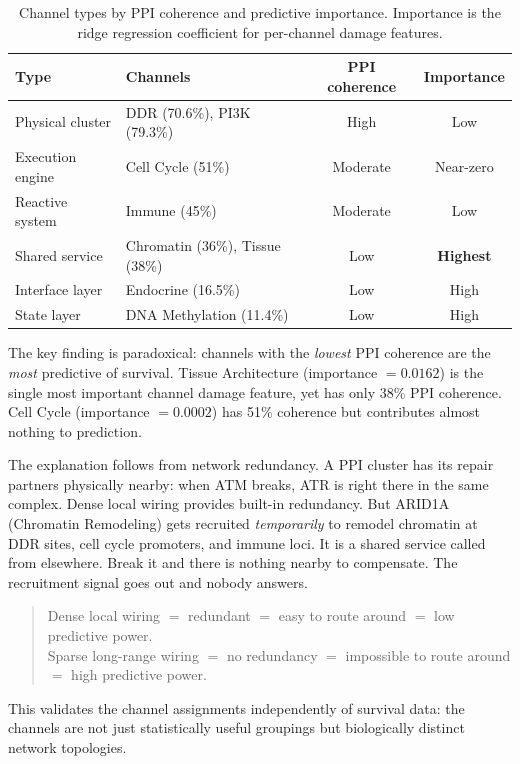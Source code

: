 \documentclass[11pt]{article}
\begin{document}
\begin{table}[ht]
\centering
\caption{Channel types by PPI coherence and predictive
importance. Importance is the ridge regression coefficient for
per-channel damage features.}
\label{tab:ppi}
\begin{tabular}{@{}llcc@{}}
\toprule
Type & Channels & PPI coherence & Importance \\
\midrule
Physical cluster & DDR (70.6\%), PI3K (79.3\%) & High & Low \\
Execution engine & Cell Cycle (51\%) & Moderate & Near-zero \\
Reactive system & Immune (45\%) & Moderate & Low \\
Shared service & Chromatin (36\%), Tissue (38\%) & Low & \textbf{Highest} \\
Interface layer & Endocrine (16.5\%) & Low & High \\
State layer & DNA Methylation (11.4\%) & Low & High \\
\bottomrule
\end{tabular}
\end{table}

The key finding is paradoxical: channels with the \emph{lowest}
PPI coherence are the \emph{most} predictive of survival.
Tissue Architecture (importance $= 0.0162$) is the single most
important channel damage feature, yet has only 38\% PPI
coherence. Cell Cycle (importance $= 0.0002$) has 51\% coherence
but contributes almost nothing to prediction.

The explanation follows from network redundancy. A PPI cluster
has its repair partners physically nearby: when ATM breaks, ATR
is right there in the same complex. Dense local wiring provides
built-in redundancy. But ARID1A (Chromatin Remodeling) gets
recruited \emph{temporarily} to remodel chromatin at DDR sites,
cell cycle promoters, and immune loci. It is a shared service
called from elsewhere. Break it and there is nothing nearby to
compensate. The recruitment signal goes out and nobody answers.

\begin{quote}
Dense local wiring $=$ redundant $=$ easy to route around $=$
low predictive power.\\
Sparse long-range wiring $=$ no redundancy $=$ impossible to
route around $=$ high predictive power.
\end{quote}

This validates the channel assignments independently of survival
data: the channels are not just statistically useful groupings
but biologically distinct network topologies.
\end{document}
